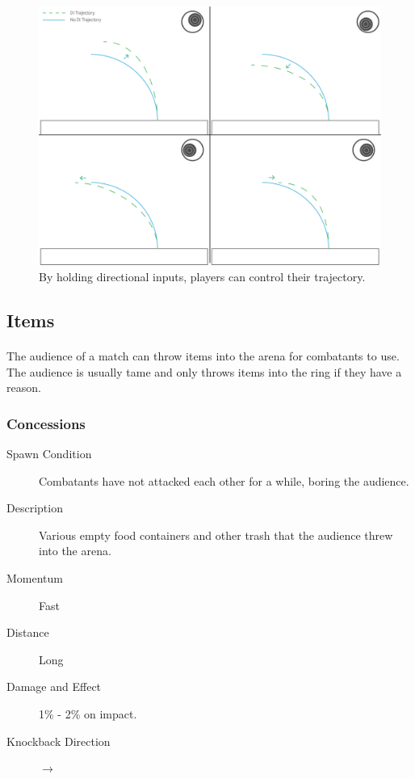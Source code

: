 \begin{figure}[h!]
    \centering
    \includegraphics[width=0.8\linewidth]{images/directional-influence.png}
    \caption{By holding directional inputs, players can control their trajectory.}
\end{figure}

\pagebreak

\subsection{Items}

\paragraph{} The audience of a match can throw items into the arena for combatants to use. The audience is usually tame and only throws items into the ring if they have a reason.

\subsubsection{Concessions}

\begin{description}
    \item[Spawn Condition] Combatants have not attacked each other for a while, boring the audience.
    \item[Description] Various empty food containers and other trash that the audience threw into the arena.
    \item[Momentum] Fast
    \item[Distance] Long
    \item[Damage and Effect] 1\% - 2\% on impact.
    \item[Knockback Direction] $\rightarrow$
\end{description}

